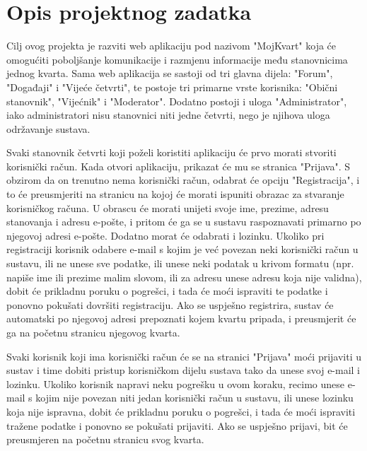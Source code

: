 \chapter{Opis projektnog zadatka}
		
	Cilj ovog projekta je razviti web aplikaciju pod nazivom "MojKvart" koja će omogućiti poboljšanje komunikacije i razmjenu informacije među stanovnicima jednog kvarta. Sama web aplikacija se sastoji od tri glavna dijela: "Forum", "Događaji" i "Vijeće četvrti", te postoje tri primarne vrste korisnika: "Obični stanovnik", "Vijećnik" i "Moderator". Dodatno postoji i uloga "Administrator", iako administratori nisu stanovnici niti jedne četvrti, nego je njihova uloga održavanje sustava.
	
	Svaki stanovnik četvrti koji poželi koristiti aplikaciju će prvo morati stvoriti korisnički račun. Kada otvori aplikaciju, prikazat će mu se stranica "Prijava". S obzirom da on trenutno nema korisnički račun, odabrat će opciju "Registracija", i to će preusmjeriti na stranicu na kojoj će morati ispuniti obrazac za stvaranje korisničkog računa. U obrascu će morati unijeti svoje ime, prezime, adresu stanovanja i adresu e-pošte, i pritom će ga se u sustavu raspoznavati primarno po njegovoj adresi e-pošte. Dodatno morat će odabrati i lozinku. Ukoliko pri registraciji korisnik odabere e-mail s kojim je već povezan neki korisnički račun u sustavu, ili ne unese sve podatke, ili unese neki podatak u krivom formatu (npr. napiše ime ili prezime malim slovom, ili za adresu unese adresu koja nije validna), dobit će prikladnu poruku o pogrešci, i tada će moći ispraviti te podatke i ponovno pokušati dovršiti registraciju. Ako se uspješno registrira, sustav će automatski po njegovoj adresi prepoznati kojem kvartu pripada, i preusmjerit će ga na početnu stranicu njegovog kvarta.
	
	Svaki korisnik koji ima korisnički račun će se na stranici "Prijava" moći prijaviti u sustav i time dobiti pristup korisničkom dijelu sustava tako da unese svoj e-mail i lozinku. Ukoliko korisnik napravi neku pogrešku u ovom koraku, recimo unese e-mail s kojim nije povezan niti jedan korisnički račun u sustavu, ili unese lozinku koja nije ispravna, dobit će prikladnu poruku o pogrešci, i tada će moći ispraviti tražene podatke i ponovno se pokušati prijaviti. Ako se uspješno prijavi, bit će preusmjeren na početnu stranicu svog kvarta.
	
